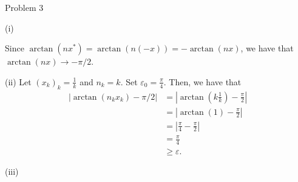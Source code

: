 \documentclass[8pt]{extarticle}
\begin{document}
\begin{problem}{Problem 3}
\begin{problem}{(i)}
\begin{description}
          Since $\arctan(nx^{\ast}) = \arctan(n(-x)) = -\arctan(nx)$, we have that $\arctan(nx) \rightarrow -\pi/2$.
      \end{description}
    \end{problem}
    \begin{problem}{(ii)}
      Let $(x_k)_k = \frac{1}{k}$ and $n_k = k$. Set $\varepsilon_0 = \frac{\pi}{4}$. Then, we have that
      \begin{align*}
        \left|\arctan(n_kx_k) - \pi/2\right| &= \left|\arctan\left(k\frac{1}{k}\right) - \frac{\pi}{2}\right|\\
                                             &= \left|\arctan(1)-\frac{\pi}{2}\right|\\
                                             &= \left|\frac{\pi}{4}-\frac{\pi}{2}\right|\\
                                             &=\frac{\pi}{4}\\
                                             &\geq \varepsilon.
      \end{align*}
    \end{problem}
    \begin{problem}{(iii)}
      
    \end{problem}
  \end{problem}
\end{document}
